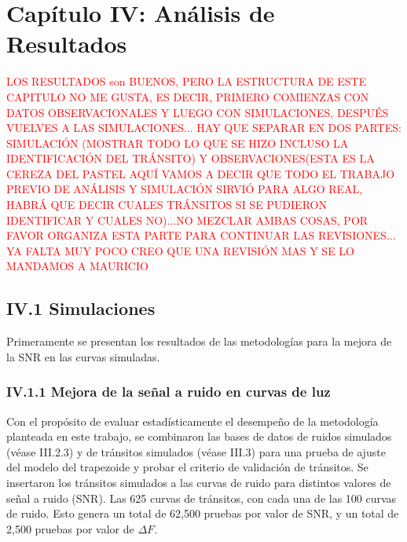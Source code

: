 \chapter*{\textbf{Capítulo IV: Análisis de Resultados}}
\label{ch:Resultados}
\setcounter{chapter}{4}
\setcounter{equation}{0}
\setcounter{figure}{0}
\setcounter{table}{0}

\textcolor{red}{LOS RESULTADOS son BUENOS, PERO LA ESTRUCTURA DE ESTE CAPITULO NO ME GUSTA, ES DECIR, PRIMERO COMIENZAS CON DATOS OBSERVACIONALES Y LUEGO CON SIMULACIONES, DESPUÉS VUELVES A LAS SIMULACIONES... HAY QUE SEPARAR EN DOS PARTES: SIMULACIÓN (MOSTRAR TODO LO QUE SE HIZO INCLUSO LA IDENTIFICACIÓN DEL TRÁNSITO) Y OBSERVACIONES(ESTA ES LA CEREZA DEL PASTEL AQUÍ VAMOS A DECIR QUE TODO EL TRABAJO PREVIO DE ANÁLISIS Y SIMULACIÓN SIRVIÓ PARA ALGO REAL, HABRÁ QUE DECIR CUALES TRÁNSITOS SI SE PUDIERON IDENTIFICAR Y CUALES NO)...NO MEZCLAR AMBAS COSAS, POR FAVOR ORGANIZA ESTA PARTE PARA CONTINUAR LAS REVISIONES... YA FALTA MUY POCO CREO QUE UNA REVISIÓN MAS Y SE LO MANDAMOS A MAURICIO}

\section*{IV.1 Simulaciones}

Primeramente se presentan los resultados de las metodologías para la mejora de la SNR en las curvas simuladas.

\subsection*{IV.1.1 Mejora de la señal a ruido en curvas de luz}

Con el propósito de evaluar estadísticamente el desempeño de la metodología planteada en este trabajo, se combinaron las bases de datos de ruidos simulados (véase III.2.3) y de tránsitos simulados (véase III.3) para una prueba de ajuste del modelo del trapezoide y probar el criterio de validación de tránsitos. Se insertaron los tránsitos simulados a las curvas de ruido para distintos valores de señal a ruido (SNR). Las 625 curvas de tránsitos, con cada una de las 100 curvas de ruido. Esto genera un total de 62,500 pruebas por valor de SNR, y un total de 2,500 pruebas por valor de $\Delta F$.

